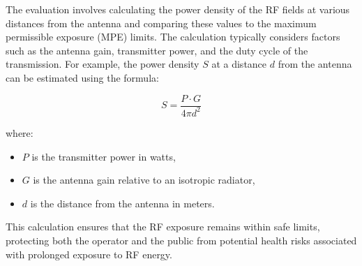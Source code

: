 The evaluation involves calculating the power density of the RF fields at various distances from the antenna and comparing these values to the maximum permissible exposure (MPE) limits. The calculation typically considers factors such as the antenna gain, transmitter power, and the duty cycle of the transmission. For example, the power density \( S \) at a distance \( d \) from the antenna can be estimated using the formula:

\[
S = \frac{P \cdot G}{4 \pi d^2}
\]

where:
\begin{itemize}
    \item \( P \) is the transmitter power in watts,
    \item \( G \) is the antenna gain relative to an isotropic radiator,
    \item \( d \) is the distance from the antenna in meters.
\end{itemize}

This calculation ensures that the RF exposure remains within safe limits, protecting both the operator and the public from potential health risks associated with prolonged exposure to RF energy.

